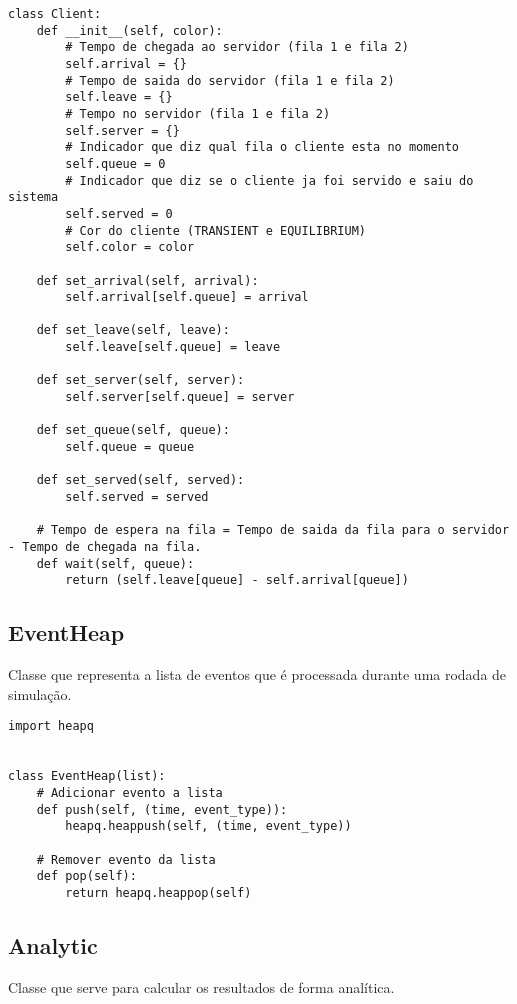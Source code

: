 \begin{lstlisting}
class Client:
    def __init__(self, color):
        # Tempo de chegada ao servidor (fila 1 e fila 2)
        self.arrival = {}
        # Tempo de saida do servidor (fila 1 e fila 2)
        self.leave = {}
        # Tempo no servidor (fila 1 e fila 2)
        self.server = {}
        # Indicador que diz qual fila o cliente esta no momento
        self.queue = 0
        # Indicador que diz se o cliente ja foi servido e saiu do sistema
        self.served = 0
        # Cor do cliente (TRANSIENT e EQUILIBRIUM)
        self.color = color

    def set_arrival(self, arrival):
        self.arrival[self.queue] = arrival

    def set_leave(self, leave):
        self.leave[self.queue] = leave

    def set_server(self, server):
        self.server[self.queue] = server

    def set_queue(self, queue):
        self.queue = queue
        
    def set_served(self, served):
        self.served = served

    # Tempo de espera na fila = Tempo de saida da fila para o servidor - Tempo de chegada na fila.
    def wait(self, queue):
        return (self.leave[queue] - self.arrival[queue])
\end{lstlisting}

\subsection{EventHeap}
Classe que representa a lista de eventos que é processada durante uma rodada de simulação.\\

\begin{lstlisting}
import heapq


class EventHeap(list):
    # Adicionar evento a lista
    def push(self, (time, event_type)):
        heapq.heappush(self, (time, event_type))

    # Remover evento da lista
    def pop(self):
        return heapq.heappop(self)
\end{lstlisting}

\subsection{Analytic}
Classe que serve para calcular os resultados de forma analítica.\\

